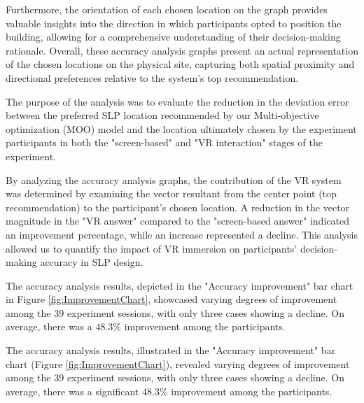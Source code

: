 Furthermore, the orientation of each chosen location on the graph provides valuable insights into the direction in which participants opted to position the building, allowing for a comprehensive understanding of their decision-making rationale. Overall, these accuracy analysis graphs present an actual representation of the chosen locations on the physical site, capturing both spatial proximity and directional preferences relative to the system's top recommendation.

The purpose of the analysis was to evaluate the reduction in the deviation error between the preferred SLP location recommended by our Multi-objective optimization (MOO) model and the location ultimately chosen by the experiment participants in both the "screen-based" and "VR interaction" stages of the experiment.

By analyzing the accuracy analysis graphs, the contribution of the VR system was determined by examining the vector resultant from the center point (top recommendation) to the participant's chosen location. A reduction in the vector magnitude in the "VR answer" compared to the "screen-based answer" indicated an improvement percentage, while an increase represented a decline. This analysis allowed us to quantify the impact of VR immersion on participants' decision-making accuracy in SLP design.

The accuracy analysis results, depicted in the "Accuracy improvement" bar chart in Figure \ref{fig:ImprovementChart}, showcased varying degrees of improvement among the 39 experiment sessions, with only three cases showing a decline. On average, there was a \(48.3\%\) improvement among the participants.

The accuracy analysis results, illustrated in the "Accuracy improvement" bar chart (Figure \ref{fig:ImprovementChart}), revealed varying degrees of improvement among the 39 experiment sessions, with only three cases showing a decline. On average, there was a significant \(48.3\%\) improvement among the participants.



